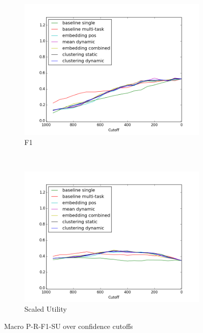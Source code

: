 \documentclass{article}
\begin{document}
\begin{figure}[tb]
\begin{subfigure}[b]{\officialRunWidth}
            \includegraphics[width=\textwidth]{fig/macroF1}
			\caption{F1}
			\label{official:macrof1}
    \end{subfigure}
    ~
    \begin{subfigure}[b]{\officialRunWidth}
            \includegraphics[width=\textwidth]{fig/macroSU}
			\caption{Scaled Utility}
			\label{official:macrosu}
    \end{subfigure}
\caption{Macro P-R-F1-SU over confidence cutoffs}
\label{macroRuns}
\end{figure}
\end{document}
